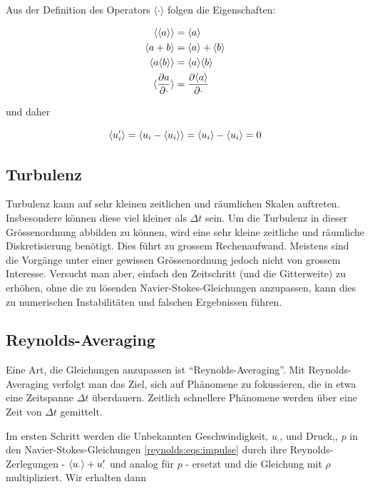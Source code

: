 Aus der Definition des Operators $\langle \cdot \rangle$ folgen die Eigenschaften:

\begin{align}
    \langle \langle a \rangle \rangle &= \langle a \rangle \\
    \langle a + b \rangle &= \langle a \rangle + \langle b \rangle \\
    \langle a \langle b \rangle \rangle &= \langle a \rangle \langle b \rangle \\
    \langle \frac{\partial a}{\partial \cdot} \rangle &= \frac{\partial \langle a \rangle}{\partial \cdot}
\end{align}

und daher

\begin{equation}
    \label{reynolds:eqs:trans-cancel}
    \langle u_i' \rangle = \langle u_i - \langle u_i \rangle \rangle = \langle u_i \rangle - \langle u_i \rangle = 0
\end{equation}

\subsection{Turbulenz}

Turbulenz kann auf sehr kleinen zeitlichen und räumlichen Skalen auftreten.
Insbesondere können diese viel kleiner als $\Delta t$ sein. Um die Turbulenz in dieser
Grössenordnung abbilden zu können, wird eine sehr kleine zeitliche und räumliche Diskretisierung
benötigt. Dies führt zu grossem Rechenaufwand. Meistens sind die Vorgänge unter
einer gewissen Grössenordnung jedoch nicht von grossem Interesse. Versucht man aber, einfach den Zeitschritt
(und die Gitterweite) zu erhöhen, ohne die zu lösenden Navier-Stokes-Gleichungen
anzupassen, kann dies zu numerischen Instabilitäten und falschen Ergebnissen führen.

\subsection{Reynolds-Averaging}
Eine Art, die Gleichungen anzupassen ist ``Reynolds-Averaging''. Mit Reynolds-Averaging verfolgt
man das Ziel, sich auf Phänomene zu fokussieren, die in etwa eine Zeitspanne $\Delta t$ überdauern.
Zeitlich schnellere Phänomene werden über eine Zeit von $\Delta t$ gemittelt.

Im ersten Schritt werden die Unbekannten Geschwindigkeit, $u_\cdot$, und Druck,, $p$ in den Navier-Stokes-Gleichungen
\ref{reynolds:eqs:impulse} durch ihre Reynolds-Zerlegungen - $\langle u_\cdot \rangle + u_\cdot'$ und analog für $p$ - ersetzt und die Gleichung
mit $\rho$ multipliziert. Wir erhalten dann

